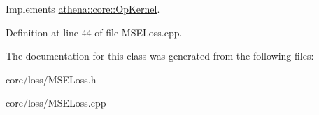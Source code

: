 Implements \mbox{\hyperlink{classathena_1_1core_1_1_op_kernel_a762e541463ffd089b47a8e6755c30fe1}{athena\+::core\+::\+Op\+Kernel}}.



Definition at line 44 of file M\+S\+E\+Loss.\+cpp.



The documentation for this class was generated from the following files\+:\begin{DoxyCompactItemize}
\item 
core/loss/M\+S\+E\+Loss.\+h\item 
core/loss/M\+S\+E\+Loss.\+cpp\end{DoxyCompactItemize}
